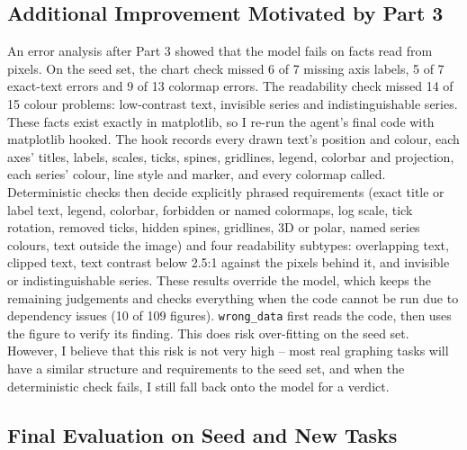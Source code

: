 \documentclass[11pt]{article}
\begin{document}
\subsection{Additional Improvement Motivated by Part 3}
An error analysis after Part 3 showed that the model fails on facts read
from pixels. On the seed set, the chart check missed 6 of 7 missing
axis labels, 5 of 7 exact-text errors and 9 of 13 colormap errors. The
readability check missed 14 of 15 colour problems: low-contrast text, invisible
series and indistinguishable series. These facts exist exactly in matplotlib,
so I re-run the agent's final code with matplotlib hooked. The hook records
every drawn text's position and colour, each axes' titles, labels, scales,
ticks, spines, gridlines, legend, colorbar and projection, each series' colour,
line style and marker, and every colormap called. Deterministic checks then
decide explicitly phrased requirements (exact title or label text, legend,
colorbar, forbidden or named colormaps, log scale, tick rotation, removed ticks,
hidden spines, gridlines, 3D or polar, named series colours, text outside the
image) and four readability subtypes: overlapping text, clipped text, text
contrast below 2.5:1 against the pixels behind it, and invisible or
indistinguishable series. These results override the model, which keeps the
remaining judgements and checks everything when the code cannot be run due to dependency issues
(10 of 109 figures). \texttt{wrong\_data} first reads the code, then
uses the figure to verify its finding. This does risk over-fitting on the seed set. However, I believe that this risk is not very high -- most real graphing tasks will have a similar structure and requirements to the seed set, and when the deterministic check fails, I still fall back onto the model for a verdict.

\subsection{Final Evaluation on Seed and New Tasks}
\end{document}
